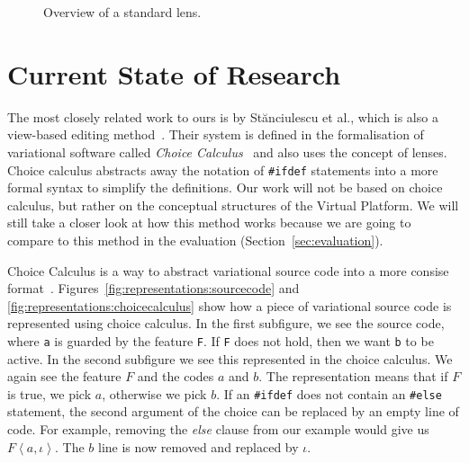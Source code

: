 \begin{figure}
  \centering
  \caption{Overview of a standard lens.}
  \label{fig:lens:overview}
\end{figure}

\section{Current State of Research}
The most closely related work to ours is by St{\u{a}}nciulescu et al., which is
also a view-based editing method~\cite{stuanciulescu2016}. Their system is
defined in the formalisation of variational software called \emph{Choice Calculus}~\cite{walkingshaw2014}
and also uses the concept of lenses.
Choice calculus abstracts away the notation of \texttt{\#ifdef} statements into
a more formal syntax to simplify the definitions. Our work will not be 
based on choice calculus, but rather on the conceptual structures of the Virtual
Platform. We will still take a closer look at how this method works because we are
going to compare to this method in the evaluation (Section~\ref{sec:evaluation}).

Choice Calculus is a way to abstract variational source code into a more consise
format~\cite{erwig2011choice}. Figures~\ref{fig:representations:sourcecode} and 
\ref{fig:representations:choicecalculus} show how a piece of variational source
code is represented using choice calculus. In the first subfigure, we see the source
code, where \texttt{a} is guarded by the feature \texttt{F}. If \texttt{F} does not
hold, then we want \texttt{b} to be active. In the second subfigure we see this
represented in the choice calculus. We again see the feature $F$ and the codes $a$
and $b$. The representation means that if $F$ is true, we pick $a$, otherwise we
pick $b$. If an \texttt{\#ifdef} does not contain an \texttt{\#else} statement,
the second argument of the choice can be replaced by an empty line of code. For
example, removing the \emph{else} clause from our example would give us \(\mathit{F}\!\left<a, \iota\right>\).
The $b$ line is now removed and replaced by \(\iota\). 

